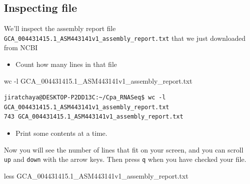 \documentclass[
  letterpaper,
  DIV=11,
  numbers=noendperiod]{scrreprt}
\newenvironment{Shaded}{\begin{snugshade}}{\end{snugshade}}
\newcommand{\AttributeTok}[1]{\textcolor[rgb]{0.40,0.45,0.13}{#1}}
\newcommand{\FunctionTok}[1]{\textcolor[rgb]{0.28,0.35,0.67}{#1}}
\newcommand{\NormalTok}[1]{\textcolor[rgb]{0.00,0.23,0.31}{#1}}
\providecommand{\tightlist}{%
  \setlength{\itemsep}{0pt}\setlength{\parskip}{0pt}}\usepackage{longtable,booktabs,array}
\begin{document}
\hypertarget{inspecting-file}{%
\subsection*{Inspecting file}\label{inspecting-file}}

We'll inspect the assembly report file
\texttt{GCA\_004431415.1\_ASM443141v1\_assembly\_report.txt} that we
just downloaded from NCBI

\begin{itemize}
\tightlist
\item
  Count how many lines in that file
\end{itemize}

\begin{Shaded}
\begin{Highlighting}[]
\FunctionTok{wc} \AttributeTok{{-}l}\NormalTok{ GCA\_004431415.1\_ASM443141v1\_assembly\_report.txt}
\end{Highlighting}
\end{Shaded}

\begin{verbatim}
jiratchaya@DESKTOP-P2DD13C:~/Cpa_RNASeq$ wc -l GCA_004431415.1_ASM443141v1_assembly_report.txt
743 GCA_004431415.1_ASM443141v1_assembly_report.txt
\end{verbatim}

\begin{itemize}
\tightlist
\item
  Print some contents at a time.
\end{itemize}

Now you will see the number of lines that fit on your screen, and you
can scroll \texttt{up} and \texttt{down} with the arrow keys. Then press
\texttt{q} when you have checked your file.

\begin{Shaded}
\begin{Highlighting}[]
\FunctionTok{less}\NormalTok{ GCA\_004431415.1\_ASM443141v1\_assembly\_report.txt}
\end{Highlighting}
\end{Shaded}
\end{document}
